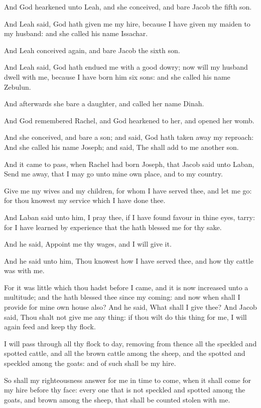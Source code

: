 \verse And God hearkened unto Leah, and she conceived, and bare Jacob the fifth son.

\verse And Leah said, God hath given me my hire, because I have given my maiden to my husband: and she called his name Issachar.

\verse And Leah conceived again, and bare Jacob the sixth son.

\verse And Leah said, God hath endued me with a good dowry; now will my husband dwell with me, because I have born him six sons: and she called his name Zebulun.

\verse And afterwards she bare a daughter, and called her name Dinah.

\verse And God remembered Rachel, and God hearkened to her, and opened her womb.

\verse And she conceived, and bare a son; and said, God hath taken away my reproach: \verse And she called his name Joseph; and said, The \LORD shall add to me another son.

\verse And it came to pass, when Rachel had born Joseph, that Jacob said unto Laban, Send me away, that I may go unto mine own place, and to my country.

\verse Give me my wives and my children, for whom I have served thee, and let me go: for thou knowest my service which I have done thee.

\verse And Laban said unto him, I pray thee, if I have found favour in thine eyes, tarry: for I have learned by experience that the \LORD hath blessed me for thy sake.

\verse And he said, Appoint me thy wages, and I will give it.

\verse And he said unto him, Thou knowest how I have served thee, and how thy cattle was with me.

\verse For it was little which thou hadst before I came, and it is now increased unto a multitude; and the \LORD hath blessed thee since my coming: and now when shall I provide for mine own house also?  \verse And he said, What shall I give thee? And Jacob said, Thou shalt not give me any thing: if thou wilt do this thing for me, I will again feed and keep thy flock.

\verse I will pass through all thy flock to day, removing from thence all the speckled and spotted cattle, and all the brown cattle among the sheep, and the spotted and speckled among the goats: and of such shall be my hire.

\verse So shall my righteousness answer for me in time to come, when it shall come for my hire before thy face: every one that is not speckled and spotted among the goats, and brown among the sheep, that shall be counted stolen with me.

